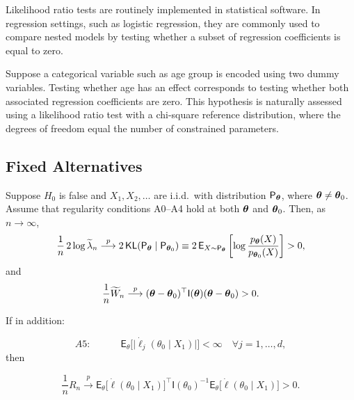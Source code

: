 \begin{note}
Likelihood ratio tests are routinely implemented in statistical software. In regression settings, such as logistic regression, they are commonly used to compare nested models by testing whether a subset of regression coefficients is equal to zero.
\end{note}

\begin{ex}
Suppose a categorical variable such as age group is encoded using two dummy variables. Testing whether age has an effect corresponds to testing whether both associated regression coefficients are zero. This hypothesis is naturally assessed using a likelihood ratio test with a chi-square reference distribution, where the degrees of freedom equal the number of constrained parameters.
\end{ex}

\subsection{Fixed Alternatives}

\begin{theo}\label{thm:fixed-alternatives}
Suppose \(H_0\) is false and \(X_1,X_2,\dots\) are i.i.d.\ with distribution \(\mathsf{P}_{\boldsymbol{\theta}}\), where \(\boldsymbol{\theta} \neq \boldsymbol{\theta}_0\).
Assume that regularity conditions A0--A4 hold at both \(\boldsymbol{\theta}\) and \(\boldsymbol{\theta}_0\).
Then, as \(n \to \infty\),
\begin{equation}\label{eq:lr-fixed}
\frac{1}{n} \, 2 \log \widetilde{\lambda}_n
\stackrel{p}{\longrightarrow}
2 \, \mathsf{KL}(\mathsf{P}_{\boldsymbol{\theta}} \mid \mathsf{P}_{\boldsymbol{\theta}_0})
\equiv
2 \, \mathsf{E}_{X \sim \mathsf{P}_{\boldsymbol{\theta}}}
\left[
\log \frac{p_{\boldsymbol{\theta}}(X)}{p_{\boldsymbol{\theta}_0}(X)}
\right]
> 0 ,
\end{equation}
and
\begin{equation}\label{eq:wald-fixed}
\frac{1}{n} \widetilde{W}_n
\stackrel{p}{\longrightarrow}
(\boldsymbol{\theta} - \boldsymbol{\theta}_0)^{\top}
\mathsf{I}(\boldsymbol{\theta})
(\boldsymbol{\theta} - \boldsymbol{\theta}_0)
> 0 .
\end{equation}

If in addition:

\[
    A5: \quad \quad \quad 
\mathsf{E}_{\theta}
\big[
\lvert \dot{\ell}_j(\theta_0 \mid X_1) \rvert
\big]
< \infty \quad 
\forall j = 1,\dots,d,
\]
then

\begin{equation}\label{eq:rao-fixed}
\frac{1}{n} R_n
\xrightarrow{p}
\mathsf{E}_{\theta}
\big[
\dot{\ell}(\theta_0 \mid X_1)
\big]^{\top}
\mathsf{I}(\theta_0)^{-1}
\mathsf{E}_{\theta}
\big[
\dot{\ell}(\theta_0 \mid X_1)
\big]
> 0 .
\end{equation}
\end{theo}

